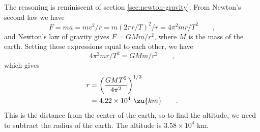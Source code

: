 The reasoning is reminiscent of section \ref{sec:newton-gravity}. From
Newton's second law we have
\begin{equation*}
 F=ma=mv^2/r=m(2\pi r/T)^2/r=4\pi^2mr/T^2 \qquad ,
\end{equation*}
and Newton's law of gravity gives
$F=GMm/r^2$, where $M$ is the mass of the earth. Setting
these expressions equal to each other, we have
\begin{equation*}
        4\pi ^2 mr/T^2  =  GMm/r^2   \qquad   ,
\end{equation*}
which gives
\begin{align*}
        r     &=  \left(\frac{GMT^2}{4\pi^2}\right)^{1/3}    \\
             &=    4.22\times10^4\  \zu{km}   \qquad   .
\end{align*}
This is the distance from the center of the earth, so to
find the altitude, we need to subtract the radius of the
earth. The altitude is $3.58\times10^4$  km.



